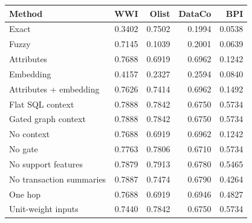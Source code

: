\begin{tabular}{lrrrr}
\toprule
Method & WWI & Olist & DataCo & BPI \\
\midrule
Exact & 0.3402 & 0.7502 & 0.1994 & 0.0538 \\
Fuzzy & 0.7145 & 0.1039 & 0.2001 & 0.0639 \\
Attributes & 0.7688 & 0.6919 & 0.6962 & 0.1242 \\
Embedding & 0.4157 & 0.2327 & 0.2594 & 0.0840 \\
Attributes + embedding & 0.7626 & 0.7414 & 0.6962 & 0.1492 \\
Flat SQL context & 0.7888 & 0.7842 & 0.6750 & 0.5734 \\
Gated graph context & 0.7888 & 0.7842 & 0.6750 & 0.5734 \\
No context & 0.7688 & 0.6919 & 0.6962 & 0.1242 \\
No gate & 0.7763 & 0.7806 & 0.6710 & 0.5734 \\
No support features & 0.7879 & 0.7913 & 0.6780 & 0.5465 \\
No transaction summaries & 0.7887 & 0.7474 & 0.6790 & 0.4264 \\
One hop & 0.7688 & 0.6919 & 0.6946 & 0.4827 \\
Unit-weight inputs & 0.7440 & 0.7842 & 0.6750 & 0.5734 \\
\bottomrule
\end{tabular}
